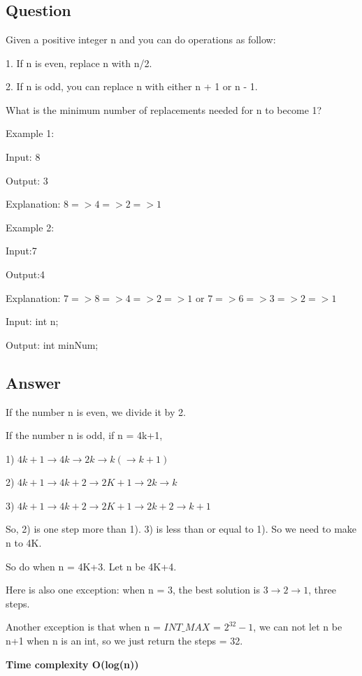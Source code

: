 \section{}
\subsection{Question}
Given a positive integer n and you can do operations as follow:

1. If n is even, replace n with n/2.

2. If n is odd, you can replace n with either n + 1 or n - 1.

What is the minimum number of replacements needed for n to become 1?

Example 1:

Input: 8

Output: 3

Explanation: $8 => 4 => 2 => 1$

Example 2:

Input:7

Output:4

Explanation: $7 => 8 => 4 => 2 => 1$ or $7 => 6 => 3 => 2 => 1$

Input: int n;

Output: int minNum;

\subsection{Answer}
If the number n is even, we divide it by 2.

If the number n is odd, if n = 4k+1, 

1) $4k+1  \rightarrow 4k \rightarrow 2k \rightarrow k (\rightarrow k+1)$

2) $4k+1 \rightarrow 4k+2 \rightarrow 2K+1 \rightarrow 2k \rightarrow k$

3) $4k+1 \rightarrow 4k+2 \rightarrow 2K+1 \rightarrow 2k+2 \rightarrow k+1$
 
So, 2) is one step more than 1). 3) is less than or equal to 1). So we need to make n to 4K.

So do when n = 4K+3. Let n be 4K+4.

Here is also one exception:
when n = 3, the best solution is $3 \rightarrow 2 \rightarrow 1$, three steps.

Another exception is that when n = $INT\_MAX$ = $2^{32} - 1$, we can not let n be n+1 when n is an int, so we just return the steps  = 32.


\textbf{\color{red}Time complexity O(log(n))}
\newpage
